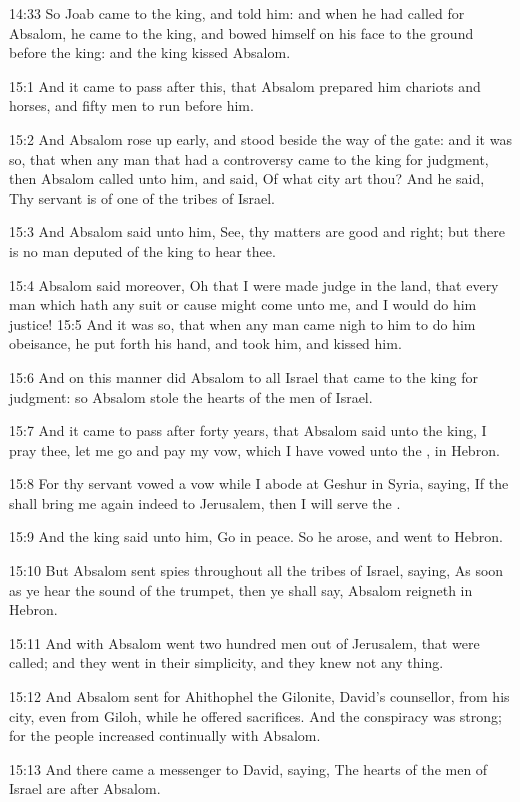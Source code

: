 14:33 So Joab came to the king, and told him: and when he had called
for Absalom, he came to the king, and bowed himself on his face to the
ground before the king: and the king kissed Absalom.

15:1 And it came to pass after this, that Absalom prepared him
chariots and horses, and fifty men to run before him.

15:2 And Absalom rose up early, and stood beside the way of the gate:
and it was so, that when any man that had a controversy came to the
king for judgment, then Absalom called unto him, and said, Of what
city art thou? And he said, Thy servant is of one of the tribes of
Israel.

15:3 And Absalom said unto him, See, thy matters are good and right;
but there is no man deputed of the king to hear thee.

15:4 Absalom said moreover, Oh that I were made judge in the land,
that every man which hath any suit or cause might come unto me, and I
would do him justice!  15:5 And it was so, that when any man came nigh
to him to do him obeisance, he put forth his hand, and took him, and
kissed him.

15:6 And on this manner did Absalom to all Israel that came to the
king for judgment: so Absalom stole the hearts of the men of Israel.

15:7 And it came to pass after forty years, that Absalom said unto the
king, I pray thee, let me go and pay my vow, which I have vowed unto
the \LORD, in Hebron.

15:8 For thy servant vowed a vow while I abode at Geshur in Syria,
saying, If the \LORD shall bring me again indeed to Jerusalem, then I
will serve the \LORD.

15:9 And the king said unto him, Go in peace. So he arose, and went to
Hebron.

15:10 But Absalom sent spies throughout all the tribes of Israel,
saying, As soon as ye hear the sound of the trumpet, then ye shall
say, Absalom reigneth in Hebron.

15:11 And with Absalom went two hundred men out of Jerusalem, that
were called; and they went in their simplicity, and they knew not any
thing.

15:12 And Absalom sent for Ahithophel the Gilonite, David's
counsellor, from his city, even from Giloh, while he offered
sacrifices. And the conspiracy was strong; for the people increased
continually with Absalom.

15:13 And there came a messenger to David, saying, The hearts of the
men of Israel are after Absalom.

